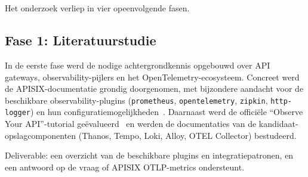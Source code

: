 
\chapter{}%
\label{ch:methodologie}


Het onderzoek verliep in vier opeenvolgende fasen.

\section{Fase 1: Literatuurstudie}%
\label{sec:fase-literatuurstudie}

In de eerste fase werd de nodige achtergrondkennis opgebouwd over API gateways, observability-pijlers en het OpenTelemetry-ecosysteem. Concreet werd de APISIX-documentatie grondig doorgenomen, met bijzondere aandacht voor de beschikbare observability-plugins (\texttt{prometheus}, \texttt{opentelemetry}, \texttt{zipkin}, \texttt{http-logger}) en hun configuratiemogelijkheden~\autocite{APISIX2024}. Daarnaast werd de officiële ``Observe Your API''-tutorial geëvalueerd~\autocite{APISIXObserveTutorial2024} en werden de documentaties van de kandidaat-opslagcomponenten (Thanos, Tempo, Loki, Alloy, OTEL Collector) bestudeerd.

Deliverable: een overzicht van de beschikbare plugins en integratiepatronen, en een antwoord op de vraag of APISIX OTLP-metrics ondersteunt.

